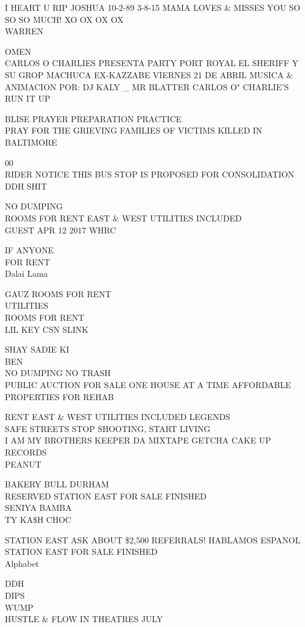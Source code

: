 \documentclass[10pt,letterpaper]{article}
\begin{document}
I HEART U RIP JOSHUA 10{-}2{-}89 3{-}8{-}15 MAMA LOVES \& MISSES YOU SO SO SO MUCH! XO OX OX OX\\
WARREN

OMEN\\
CARLOS O CHARLIES PRESENTA PARTY PORT ROYAL EL SHERIFF Y SU GROP MACHUCA EX{-}KAZZABE VIERNES 21 DE ABRIL MUSICA \& ANIMACION POR: DJ KALY \_ MR BLATTER CARLOS O" CHARLIE'S\\
RUN IT UP

BLISE PRAYER PREPARATION PRACTICE\\
PRAY FOR THE GRIEVING FAMILIES OF VICTIMS KILLED IN BALTIMORE

00\\
RIDER NOTICE THIS BUS STOP IS PROPOSED FOR CONSOLIDATION\\
DDH SHIT

NO DUMPING\\
ROOMS FOR RENT EAST \& WEST UTILITIES INCLUDED\\
GUEST APR 12 2017 WHRC

IF ANYONE\\
FOR RENT\\
Dalai Lama

GAUZ ROOMS FOR RENT\\
UTILITIES\\
ROOMS FOR RENT\\
LIL KEY CSN SLINK

SHAY SADIE KI\\
BEN\\
NO DUMPING NO TRASH\\
PUBLIC AUCTION FOR SALE ONE HOUSE AT A TIME AFFORDABLE PROPERTIES FOR REHAB

RENT EAST \& WEST UTILITIES INCLUDED LEGENDS\\
SAFE STREETS STOP SHOOTING, START LIVING\\
I AM MY BROTHERS KEEPER DA MIXTAPE GETCHA CAKE UP RECORDS\\
PEANUT

BAKERY BULL DURHAM\\
RESERVED STATION EAST FOR SALE FINISHED\\
SENIYA BAMBA\\
TY KA\$H CHOC

STATION EAST ASK ABOUT \$2,500 REFERRALS!  HABLAMOS ESPANOL\\
STATION EAST FOR SALE FINISHED\\
Alphabet

DDH\\
DIPS\\
WUMP\\
HUSTLE \& FLOW IN THEATRES JULY
\end{document}
